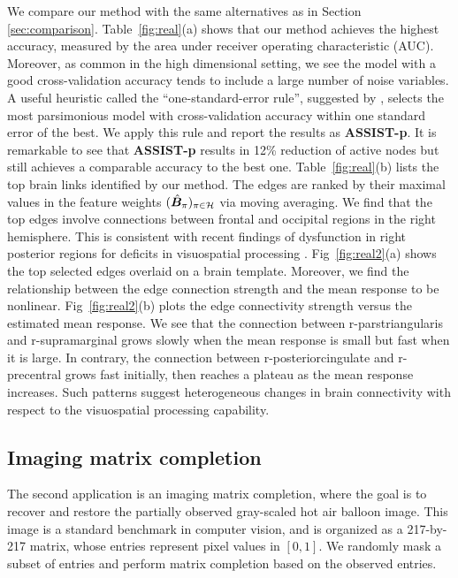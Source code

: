 \documentclass[aos]{imsart}
\theoremstyle{definition}
\begin{document}
We compare our method with the same alternatives as in Section \ref{sec:comparison}. Table~\ref{fig:real}(a) shows that our method achieves the highest accuracy, measured by the area under receiver operating characteristic (AUC). Moreover, as common in the high dimensional setting, we see the model with a good cross-validation accuracy tends to include a large number of noise variables. A useful heuristic called the ``one-standard-error rule'', suggested by \cite{hastie2015statistical}, selects the most parsimonious model with cross-validation accuracy within one standard error of the best. We apply this rule and report the results as {\bf \footnotesize ASSIST-p}. It is remarkable to see that {\bf \footnotesize ASSIST-p} results in 12\% reduction of active nodes but still achieves a comparable accuracy to the best one. Table~\ref{fig:real}(b) lists the top brain links identified by our method. The edges are ranked by their maximal values in the feature weights $(\hat {\bm B}_\pi)_{\pi \in \mathcal{H}}$ via moving averaging. We find that the top edges involve connections between frontal and occipital regions in the right hemisphere. This is consistent with recent findings of dysfunction in right posterior regions for deficits in visuospatial processing \cite{wang2019common}. Fig~\ref{fig:real2}(a) shows the top selected edges overlaid on a brain template. Moreover, we find the relationship between the edge connection strength and the mean response to be nonlinear. Fig~\ref{fig:real2}(b) plots the edge connectivity strength versus the estimated mean response. We see that the connection between r-parstriangularis and r-supramarginal grows slowly when the mean response is small but fast when it is large. In contrary, the connection between r-posteriorcingulate and r-precentral  grows fast initially, then reaches a plateau as the mean response increases. Such patterns suggest heterogeneous changes in brain connectivity with respect to the visuospatial processing capability. 



\subsection{Imaging matrix completion}
\label{sec:completion}

The second application is an imaging matrix completion, where the goal is to recover and restore the partially observed gray-scaled hot air balloon image. This image is a standard benchmark in computer vision, and is organized as a 217-by-217 matrix, whose entries represent pixel values in $[0,1]$. We randomly mask a subset of entries and perform matrix completion based on the observed entries. 
\end{document}
